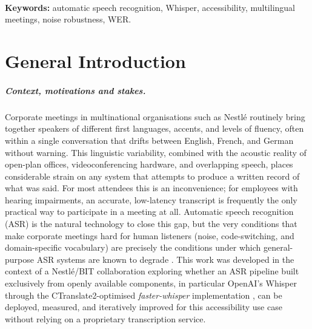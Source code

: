 \documentclass[12pt]{report}
\begin{document}
\\
\textbf{Keywords:} automatic speech recognition, Whisper, accessibility, multilingual meetings, noise robustness, WER.
\thispagestyle{fancy}
\setcounter{page}{6}
\newpage
{}
{}
\setcounter{page}{7}
\thispagestyle{fancy}
\newpage
\listoffigures
\thispagestyle{fancy}
{}
\newpage
\listoftables
\thispagestyle{fancy}
{}
\newpage
{}
{}
\chapter*{General Introduction}
\thispagestyle{fancy}
\setcounter{page}{1}
\paragraph{Context, motivations and stakes.}
Corporate meetings in multinational organisations such as Nestlé routinely bring together speakers of different first languages, accents, and levels of fluency, often within a single conversation that drifts between English, French, and German without warning. This linguistic variability, combined with the acoustic reality of open-plan offices, videoconferencing hardware, and overlapping speech, places considerable strain on any system that attempts to produce a written record of what was said. For most attendees this is an inconvenience; for employees with hearing impairments, an accurate, low-latency transcript is frequently the only practical way to participate in a meeting at all. Automatic speech recognition (ASR) is the natural technology to close this gap, but the very conditions that make corporate meetings hard for human listeners (noise, code-switching, and domain-specific vocabulary) are precisely the conditions under which general-purpose ASR systems are known to degrade \cite{radford2023robust,baevski2020wav2vec}. This work was developed in the context of a Nestlé/BIT collaboration exploring whether an ASR pipeline built exclusively from openly available components, in particular OpenAI's Whisper through the CTranslate2-optimised \textit{faster-whisper} implementation \cite{fasterwhisper2023}, can be deployed, measured, and iteratively improved for this accessibility use case without relying on a proprietary transcription service.
\end{document}
